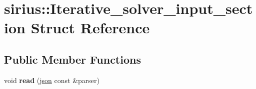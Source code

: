 \hypertarget{structsirius_1_1_iterative__solver__input__section}{}\section{sirius\+:\+:Iterative\+\_\+solver\+\_\+input\+\_\+section Struct Reference}
\label{structsirius_1_1_iterative__solver__input__section}
\subsection*{Public Member Functions}
\begin{DoxyCompactItemize}
\item 
\hypertarget{structsirius_1_1_iterative__solver__input__section_ab868a9e99aebda46684174550438e8ea}{}void {\bfseries read} (\hyperlink{classnlohmann_1_1basic__json}{json} const \&parser)\label{structsirius_1_1_iterative__solver__input__section_ab868a9e99aebda46684174550438e8ea}

\end{DoxyCompactItemize}
